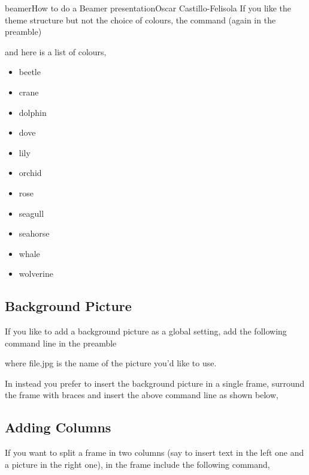 \begin{article}[2]{beamer}{How to do a Beamer presentation}{Oscar Castillo-Felisola}
  If you like the theme structure but not the choice of colours, the command (again in the preamble)


  and here is a list of colours,

  \begin{itemize}
  \item beetle
  \item crane
  \item dolphin
  \item dove
  \item lily
  \item orchid
  \item rose
  \item seagull
  \item seahorse
  \item whale
  \item wolverine
  \end{itemize}

  \subsection{Background Picture}

  If you like to add a background picture as a global setting, add the following command line in the preamble


  where file.jpg is the name of the picture you’d like to use.

  In instead you prefer to insert the background picture in a single frame, surround the frame with braces and insert the above command line as shown below,






  \subsection{Adding Columns}

  If you want to split a frame in two columns (say to insert text in the left one and a picture in the right one), in the frame include the following command,


\end{article}
